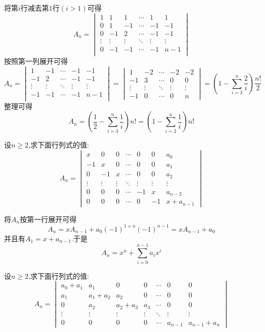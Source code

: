 \documentclass{ctexart}
\begin{document}
\begin{solution}
    将第$i$行减去第$1$行$(i>1)$可得
    \[A_n=\begin{vmatrix}
        1&1&1&\cdots&1&1\\
        0&1&-1&\cdots&-1&-1\\
        0&-1&2&\cdots&-1&-1\\
        \vdots&\vdots&\vdots&\ddots&\vdots&\vdots\\
        0&-1&-1&\cdots&-1&n-1\\
    \end{vmatrix}\]
    按照第一列展开可得
    \[A_n=\begin{vmatrix}
        1&-1&\cdots&-1&-1\\
        -1&2&\cdots&-1&-1\\
        \vdots&\vdots&\ddots&\vdots&\vdots\\
        -1&-1&\cdots&-1&n-1\\
    \end{vmatrix}=\begin{vmatrix}
        1&-2&\cdots&-2&-2\\
        -1&3&\cdots&0&0\\
        \vdots&\vdots&\ddots&\vdots&\vdots\\
        -1&0&\cdots&0&n
    \end{vmatrix}=\left(1-\sum_{i=3}^{n}\dfrac{2}{i}\right)\dfrac{n!}{2}\]
    整理可得
    \[A_n=\left(\dfrac12-\sum_{i=3}^{n}\dfrac{1}{i}\right)n!=\left(1-\sum_{i=2}^{n}\dfrac{1}{i}\right)n!\]
\end{solution}
\begin{problem}
    设$n\geqslant2$,求下面行列式的值:
    \[A_n=\begin{vmatrix}
        x&0&0&\cdots&0&0&a_0\\
        -1&x&0&\cdots&0&0&a_1\\
        0&-1&x&\cdots&0&0&a_2\\
        \vdots&\vdots&\vdots&\ddots&\vdots&\vdots&\vdots\\
        0&0&0&\cdots&-1&x&a_{n-2}\\
        0&0&0&\cdots&0&-1&x+a_{n-1}
    \end{vmatrix}\]
\end{problem}
\begin{solution}
    将$A_n$按第一行展开可得
    \[A_n=xA_{n-1}+a_0(-1)^{1+n}(-1)^{n-1}=xA_{n-1}+a_0\]
    并且有$A_1=x+a_{n-1}$.于是
    \[A_n=x^n+\sum_{i=0}^{n-1}a_ix^i\]
\end{solution}
\begin{problem}
    设$n\geqslant2$,求下面行列式的值:
    \[A_n=\begin{vmatrix}
        a_0+a_1&a_1&0&0&\cdots&0&0\\
        a_1&a_1+a_2&a_2&0&\cdots&0&0\\
        0&a_2&a_2+a_3&a_3&\cdots&0&0\\
        \vdots&\vdots&\vdots&\vdots&\ddots&\vdots&\vdots\\
        0&0&0&0&\cdots&a_{n-1}&a_{n-1}+a_n
    \end{vmatrix}\]
\end{problem}
\end{document}
